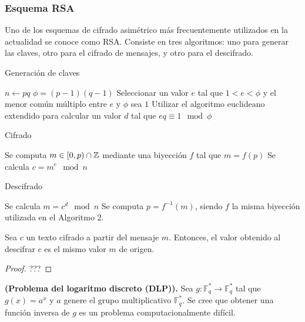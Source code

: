 \subsubsection{Esquema RSA}

Uno de los esquemas de cifrado asimétrico más frecuentemente utilizados en la actualidad se conoce como RSA. Consiste en tres algoritmos: uno para generar las claves, otro para el cifrado de mensajes, y otro para el descifrado.

\begin{algorithm}
	\caption{Generación de claves}\label{alg:1}
	$n \gets pq$ 
	$\phi = (p - 1)(q - 1)$\;
	Seleccionar un valor $e$ tal que $1 < e < \phi$ y el menor común múltiplo entre $e$ y $\phi$ sea $1$\;
	Utilizar el algoritmo euclideano extendido para calcular un valor $d$ tal que $eq \equiv 1 \mod \phi$\;
\end{algorithm}

\begin{algorithm}
	\caption{Cifrado}\label{alg:2}
	Se computa $m \in [0, p) \cap \mathbb{Z}$ mediante una biyección $f$ tal que $m = f(p)$\;
	Se calcula $c = m^e \mod n$\;
\end{algorithm}

\begin{algorithm}
	\caption{Descifrado}\label{alg:3}
	Se calcula $m = c^d \mod n$\;
	Se computa $p = f^{-1}(m)$, siendo $f$ la misma biyección utilizada en el Algoritmo 2.
\end{algorithm}

\begin{theorem}
	Sea $c$ un texto cifrado a partir del mensaje $m$. Entonces, el valor obtenido al descifrar $c$ es el mismo valor $m$ de origen.
\end{theorem}

\begin{proof}
	???
\end{proof}

\begin{example} \textbf{(Problema del logaritmo discreto (DLP)).}
	Sea $g : \mathbb{F}_q^* \rightarrow \mathbb{F}_q^*$ tal que $g(x) = a^x$ y $a$ genere el grupo multiplicativo $\mathbb{F}_q^*$. Se cree que obtener una función inversa de $g$ es un problema computacionalmente difícil.
\end{example}

